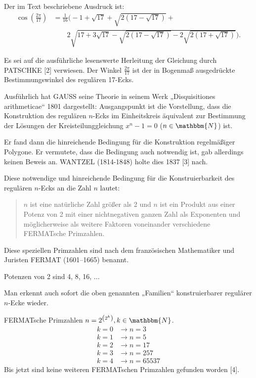 \documentclass[11pt]{article}
\newcommand{\br}[1]{\ensuremath{\left(#1\right)}}
\newcommand{\N}{\mathbbm{N}}
\begin{document}
Der im Text beschriebene Ausdruck ist: 
\begin{align*}
  \cos\br{\frac{2\pi}{17}}&= \frac{1}{16}
  \Bigg(-1+\sqrt{17}+\sqrt{{2\br{17-\sqrt{17}}}}+\\ &\qquad
  2\sqrt{17+3\sqrt{17}-\sqrt{2\br{17-\sqrt{17}}}-2\sqrt{2\br{17+\sqrt{17}}}}
  \Bigg) \tag{1}.
\end{align*}

Es sei auf die ausführliche lesenswerte Herleitung der Gleichung durch
PATSCHKE [2] verwiesen. Der Winkel $\frac{2\pi}{17}$ ist der in Bogenmaß
ausgedrückte Bestimmungswinkel des regulären 17-Ecks.

Ausführlich hat GAUSS seine Theorie in seinem Werk „Disquisitiones
arithmeticae“ 1801 dargestellt: Ausgangspunkt ist die Vorstellung, dass die
Konstruktion des regulären $n$-Ecks im Einheitskreis äquivalent zur Bestimmung
der Lösungen der Kreisteilunggleichung $x^n - 1 = 0$ ($n\in\N$) ist.

Er fand dann die hinreichende Bedingung für die Konstruktion regelmäßiger
Polygone. Er vermutete, dass die Bedingung auch notwendig ist, gab allerdings
keinen Beweis an. WANTZEL (1814-1848) holte dies 1837 [3] nach.

Diese notwendige und hinreichende Bedingung für die Konstruierbarkeit des
regulären $n$-Ecks an die Zahl $n$ lautet:
\begin{quote}
  $n$ ist eine natürliche Zahl größer als 2 und $n$ ist ein Produkt aus einer
  Potenz von 2 mit einer nichtnegativen ganzen Zahl als Exponenten und
  möglicherweise als weitere Faktoren voneinander verschiedene FERMATsche
  Primzahlen.
\end{quote}
Diese speziellen Primzahlen sind nach dem französischen Mathematiker und
Juristen FERMAT (1601--1665) benannt.

Potenzen von 2 sind 4, 8, 16, ...

Man erkennt auch sofort die oben genannten „Familien“ konstruierbarer
regulärer $n$-Ecke wieder.

FERMATsche Primzahlen $n =2^{\br{2^k}}, k\in\N$.
\begin{align*}
  k = 0 &\rightarrow{} n = 3\\
  k = 1 &\rightarrow{} n = 5\\
  k = 2 &\rightarrow{} n = 17\\
  k = 3 &\rightarrow{} n = 257\\
  k = 4 &\rightarrow{} n = 65537
\end{align*}
Bis jetzt sind keine weiteren FERMATschen Primzahlen gefunden worden [4].
\end{document}
